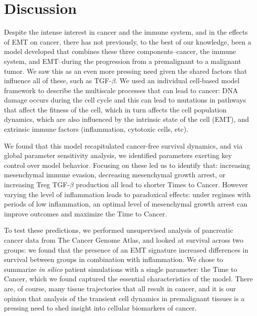 \documentclass[11pt]{article}
\begin{document}

\section{Discussion}\label{Discussion}
Despite the intense interest in cancer and the immune system, and in the effects of EMT on cancer, there has not previously, to the best of our knowledge, been a model developed that combines these three components--cancer, the immune system, and EMT--during the progression from a premalignant to a malignant tumor. We saw this as an even more pressing need given the shared factors that influence all of these, such as TGF-$\beta$. We used an individual cell-based model framework to describe the multiscale processes that can lead to cancer: DNA damage occurs during the cell cycle and this can lead to mutations in pathways that affect the fitness of the cell, which in turn affects the cell population dynamics, which are also influenced by the intrinsic state of the cell (EMT), and extrinsic immune factors (inflammation, cytotoxic cells, etc).
\par
We found that this model recapitulated cancer-free survival dynamics, and via global parameter sensitivity analysis, we identified parameters exerting key control over model behavior. Focusing on these led us to identify that: increasing mesenchymal immune evasion, decreasing mesenchymal growth arrest, or increasing Treg TGF-$\beta$ production all lead to shorter Times to Cancer. However varying the level of inflammation leads to paradoxical effects: under regimes with periods of low inflammation, an optimal level of mesenchymal growth arrest can improve outcomes and maximize the Time to Cancer.
\par
To test these predictions, we performed unsupervised analysis of pancreatic cancer data from The Cancer Genome Atlas, and looked at survival across two groups: we found that the presence of an EMT signature increased differences in survival between groups in combination with inflammation. We chose to summarize {\em in silico} patient simulations with a single parameter: the Time to Cancer, which we found captured the essential characteristics of the model. There are, of course, many tissue trajectories that all result in cancer, and it is our opinion that analysis of the transient cell dynamics in premalignant tissues is a pressing need to shed insight into cellular biomarkers of cancer.
\par
\end{document}
